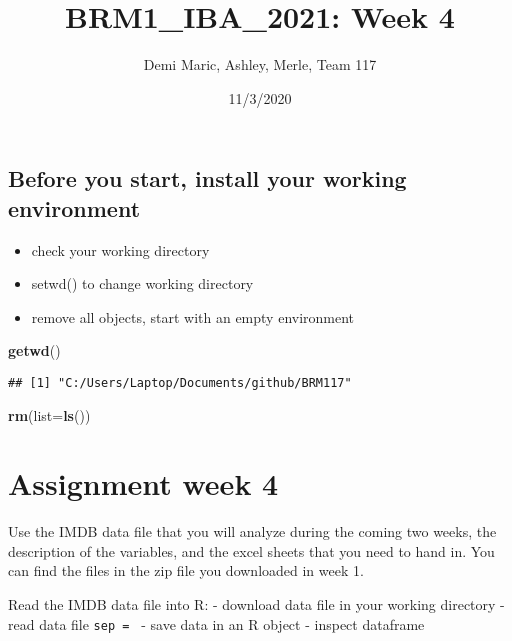 \documentclass[
]{article}
\title{BRM1\_IBA\_2021: Week 4}
\author{Demi Maric, Ashley, Merle, Team 117}
\date{11/3/2020}
\newenvironment{Shaded}{\begin{snugshade}}{\end{snugshade}}
\newcommand{\DataTypeTok}[1]{\textcolor[rgb]{0.13,0.29,0.53}{#1}}
\newcommand{\KeywordTok}[1]{\textcolor[rgb]{0.13,0.29,0.53}{\textbf{#1}}}
\newcommand{\NormalTok}[1]{#1}
\providecommand{\tightlist}{%
  \setlength{\itemsep}{0pt}\setlength{\parskip}{0pt}}
\begin{document}
\maketitle

\hypertarget{before-you-start-install-your-working-environment}{%
\subsection{Before you start, install your working
environment}\label{before-you-start-install-your-working-environment}}

\begin{itemize}
\tightlist
\item
  check your working directory
\item
  setwd() to change working directory
\item
  remove all objects, start with an empty environment
\end{itemize}

\begin{Shaded}
\begin{Highlighting}[]
\KeywordTok{getwd}\NormalTok{()}
\end{Highlighting}
\end{Shaded}

\begin{verbatim}
## [1] "C:/Users/Laptop/Documents/github/BRM117"
\end{verbatim}

\begin{Shaded}
\begin{Highlighting}[]
\KeywordTok{rm}\NormalTok{(}\DataTypeTok{list=}\KeywordTok{ls}\NormalTok{()) }
\end{Highlighting}
\end{Shaded}

\hypertarget{assignment-week-4}{%
\section{Assignment week 4}\label{assignment-week-4}}

Use the IMDB data file that you will analyze during the coming two
weeks, the description of the variables, and the excel sheets that you
need to hand in. You can find the files in the zip file you downloaded
in week 1.

Read the IMDB data file into R: - download data file in your working
directory - read data file
\texttt{sep\ =\ \textquotesingle{}\textquotesingle{}} - save data in an
R object - inspect dataframe
\end{document}
